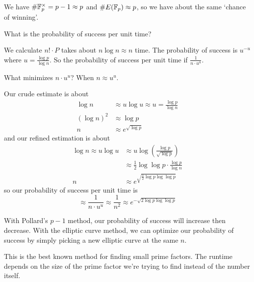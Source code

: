 We have $\#\mathbb F_p^\times = p-1\approx p$ and $\#E(\mathbb F_p)\approx p$, so we have about the same `chance of winning'.

\begin{ques*}
    What is the probability of success per unit time?
\end{ques*}
We calculate $n!\cdot P$ takes about $n\log n\approx n$ time. The probability of success is $u^{-u}$ where $u = \frac{\log p}{\log n}$. So the probability of success per unit time if $\frac{1}{n\cdot u^u}$.

What minimizes $n\cdot u^u$? When $n\approx u^u$.

Our crude estimate is about
\begin{align*}
    \log n     & \approx u\log u \approx u = \frac{\log p}{\log n} \\
    (\log n)^2 & \approx \log p                                    \\
    n          & \approx e^{\sqrt{\log p}}
\end{align*}
and our refined estimation is about
\begin{align*}
    \log n \approx u\log u & \approx u\log\left(\frac{\log p}{\sqrt{\log p}}\right)   \\
                           & \approx \frac{1}{2}\log\log p\cdot \frac{\log p}{\log n} \\
    n                      & \approx e^{\sqrt{\frac{1}{2}\log p \log\log p}}
\end{align*}
so our probability of success per unit time is
\[\approx \frac{1}{n\cdot u^u}\approx \frac{1}{n^2}\approx e^{-\sqrt{2\log p \log\log p}}\]

With Pollard's $p-1$ method, our probability of success will increase then decrease. With the elliptic curve method, we can optimize our probability of success by simply picking a new elliptic curve at the same $n$.

This is the best known method for finding small prime factors. The runtime depends on the size of the prime factor we're trying to find instead of the number itself.
